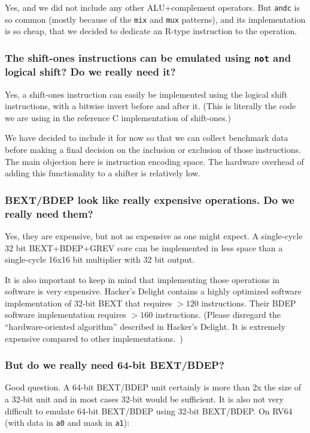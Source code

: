 Yes, and we did not include any other ALU+complement operators. But \texttt{andc}
is so common (mostly because of the \texttt{mix} and \texttt{mux} patterns), and
its implementation is so cheap, that we decided to dedicate an R-type instruction
to the operation.

\subsubsection{The shift-ones instructions can be emulated using {\tt not} and logical shift? Do we really need it?}

Yes, a shift-ones instruction can easily be implemented using the logical shift
instructions, with a bitwise invert before and after it. (This is literally the
code we are using in the reference C implementation of shift-ones.)

We have decided to include it for now so that we can collect benchmark data
before making a final decision on the inclusion or exclusion of those
instructions. The main objection here is instruction encoding space. The
hardware overhead of adding this functionality to a shifter is relatively low.

\subsubsection{BEXT/BDEP look like really expensive operations. Do we really need them?}

Yes, they are expensive, but not as expensive as one might expect. A
single-cycle 32 bit BEXT+BDEP+GREV core can be implemented in less space than a
single-cycle 16x16 bit multiplier with 32 bit output.~\cite{Wolf17B}

It is also important to keep in mind that implementing those operations in
software is very expensive. Hacker's Delight contains a highly optimized
software implementation of 32-bit BEXT that requires $>120$ instructions. Their
BDEP software implementation requires $>160$ instructions. (Please disregard the
``hardware-oriented algorithm'' described in Hacker's Delight. It is
extremely expensive compared to other implementations.~\cite{Wolf17B})

\subsubsection{But do we really need 64-bit BEXT/BDEP?}

Good question. A 64-bit BEXT/BDEP unit certainly is more than 2x the size of a
32-bit unit and in most cases 32-bit would be sufficient. It is also not very difficult
to emulate 64-bit BEXT/BDEP using 32-bit BEXT/BDEP. On RV64 (with data in {\tt a0} and
mask in {\tt a1}):

